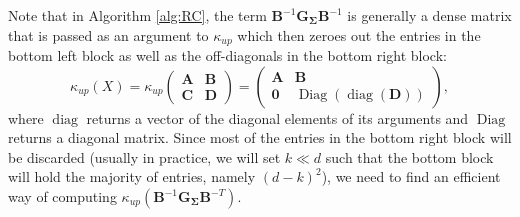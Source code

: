 \documentclass[a4paper, 11pt, oneside]{scrartcl}
\theoremstyle{break}
\DeclareMathOperator{\diag}{diag}
\DeclareMathOperator{\Diag}{Diag}
\newcommand{\matr}[1]{\boldsymbol{#1}}
\numberwithin{equation}{section}
\begin{document}
				Note that in Algorithm \ref{alg:RC}, the term $\matr{B}^{-1} \matr{G_{\Sigma}} \matr{B}^{-1}$ is generally a dense matrix that is passed as an argument to $\kappa_{up}$ which then zeroes out the entries in the bottom left block as well as the off-diagonals in the bottom right block:
				$$\kappa_{up}(X) = \kappa_{up} \begin{pmatrix} \matr{A} & \matr{B} \\ \matr{C} & \matr{D} \end{pmatrix} = \begin{pmatrix} \matr{A} & \matr{B} \\ \matr{0} & \Diag(\diag (\matr{D}))\end{pmatrix},$$
				where $\diag$ returns a vector of the diagonal elements of its arguments and $\Diag$ returns a diagonal matrix.
				Since most of the entries in the bottom right block will be discarded (usually in practice, we will set $k \ll d$ such that the bottom block will hold the majority of entries, namely $(d - k)^2$), we need to find an efficient way of computing $\kappa_{up}(\matr{B}^{-1} \matr{G_{\Sigma}} \matr{B}^{-T})$.
\end{document}
